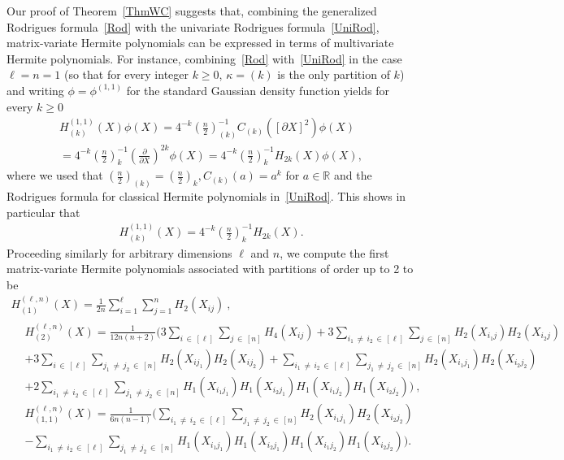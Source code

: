 \documentclass[AHL,Unicode,longabstracts,published]{cedram}
\newcommand{\R}{\mathbb{R}}
\begin{document}
Our proof of Theorem~\ref{ThmWC} suggests that, combining the generalized Rodrigues formula~\eqref{Rod} with the univariate Rodrigues formula~\eqref{UniRod}, matrix-variate Hermite polynomials can be expressed in terms of multivariate Hermite polynomials. For instance, combining~\eqref{Rod} with~\eqref{UniRod} in the case $\ell=n=1$ (so that for every integer $k\geq0$, $\kappa=(k)$ is the only partition of $k$) and writing $\phi=\phi^{(1,1)}$ for the standard Gaussian density function yields for every $k\geq 0$
\begin{multline*}
H_{(k)}^{(1,1)}(X) \phi(X) = 4^{-k} \left(\frac{n}{2}\right)_{(k)}^{-1} C_{(k)}\left([\partial X]^2\right)\phi(X)\\
= 4^{-k} \left(\frac{n}{2}\right)_{k}^{-1}
\left(\frac{\partial}{\partial X}\right)^{2k} \phi(X) =4^{-k} \left(\frac{n}{2}\right)_{k}^{-1} H_{2k}(X)\phi(X),
\end{multline*}
where we used that $(\frac{n}{2})_{(k)}=(\frac{n}{2})_{k}, C_{(k)}(a) = a^k$ for $a\in \R$ and the Rodrigues formula for classical Hermite polynomials in~\eqref{UniRod}. This shows in particular that
\begin{gather*}
H_{(k)}^{(1,1)}(X) = 4^{-k} \left(\frac{n}{2}\right)_{k}^{-1} H_{2k}(X).
\end{gather*}
Proceeding similarly for arbitrary dimensions $\ell$ and $n$, we compute the first matrix-variate Hermite polynomials associated with partitions of order up to 2 to be
\begin{multline}\label{HerPol}
 H_{(1)}^{(\ell,n)}(X) = \frac{1}{2n}\sum_{i=1}^{\ell} \sum_{j=1}^{n} H_2(X_{ij}) \ , \\
\begin{aligned}
& H_{(2)}^{(\ell,n)}(X) = \frac{1}{12n(n+2)}
\bigg(3\sum_{i\,\in\,[\ell]}\sum_{j\,\in\,[n]} H_4\left(X_{ij}\right)
 + 3\sum_{i_1\,\neq\,i_2\,\in\,[\ell]} \sum_{j\,\in\,[n]} H_2\left(X_{i_1j}\right) H_2\left(X_{i_2j}\right)\\
&+3\sum_{i\,\in\,[\ell]} \sum_{j_1\,\neq\,j_2\,\in\,[n]} H_2\left(X_{ij_1}\right) H_2\left(X_{ij_2}\right) + \sum_{i_1\,\neq\,i_2\,\in\,[\ell]} \sum_{j_1\,\neq\,j_2\,\in\,[n]} H_2\left(X_{i_1j_1}\right) H_2\left(X_{i_2j_2}\right)\\
&+ 2\sum_{i_1\,\neq\,i_2\,\in\,[\ell]} \sum_{j_1\,\neq\,j_2\,\in\,[n]} H_1\left(X_{i_1j_1}\right) H_1\left(X_{i_2j_1}\right) H_1\left(X_{i_1j_2}\right) H_1\left(X_{i_2j_2}\right) \bigg) \ , \\
&H_{(1,1)}^{(\ell,n)}(X) = \frac{1}{6n(n-1)}\bigg(
\sum_{i_1\,\neq\,i_2\,\in\,[\ell]} \sum_{j_1\,\neq\,j_2\,\in\,[n]} H_2\left(X_{i_1j_1}\right)H_2\left(X_{i_2j_2}\right)\\
& - \sum_{i_1\,\neq\,i_2\,\in\,[\ell]}
\sum_{j_1\,\neq\,j_2\,\in\,[n]} H_1\left(X_{i_1j_1}\right) H_1\left(X_{i_2j_1}\right) H_1\left(X_{i_1j_2}\right) H_1\left(X_{i_2j_2}\right) \bigg). 
\end{aligned}
\end{multline}
\end{document}
